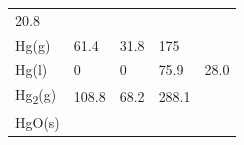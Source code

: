 \documentclass[
]{book}
\theoremstyle{definition}
\theoremstyle{definition}
\theoremstyle{definition}
\theoremstyle{remark}
\begin{document}
\begin{longtable}[]{@{}lllll@{}}
\begin{minipage}[t]{0.18\columnwidth}
20.8\strut
\end{minipage}\tabularnewline
\begin{minipage}[t]{0.10\columnwidth}\raggedright
Hg(g)\strut
\end{minipage} & \begin{minipage}[t]{0.19\columnwidth}\raggedright
61.4\strut
\end{minipage} & \begin{minipage}[t]{0.20\columnwidth}\raggedright
31.8\strut
\end{minipage} & \begin{minipage}[t]{0.18\columnwidth}\raggedright
175\strut
\end{minipage} & \begin{minipage}[t]{0.18\columnwidth}\raggedright
\strut
\end{minipage}\tabularnewline
\begin{minipage}[t]{0.10\columnwidth}\raggedright
Hg(l)\strut
\end{minipage} & \begin{minipage}[t]{0.19\columnwidth}\raggedright
0\strut
\end{minipage} & \begin{minipage}[t]{0.20\columnwidth}\raggedright
0\strut
\end{minipage} & \begin{minipage}[t]{0.18\columnwidth}\raggedright
75.9\strut
\end{minipage} & \begin{minipage}[t]{0.18\columnwidth}\raggedright
28.0\strut
\end{minipage}\tabularnewline
\begin{minipage}[t]{0.10\columnwidth}\raggedright
Hg\textsubscript{2}(g)\strut
\end{minipage} & \begin{minipage}[t]{0.19\columnwidth}\raggedright
108.8\strut
\end{minipage} & \begin{minipage}[t]{0.20\columnwidth}\raggedright
68.2\strut
\end{minipage} & \begin{minipage}[t]{0.18\columnwidth}\raggedright
288.1\strut
\end{minipage} & \begin{minipage}[t]{0.18\columnwidth}\raggedright
\strut
\end{minipage}\tabularnewline
\begin{minipage}[t]{0.10\columnwidth}\raggedright
HgO(s)\strut

\end{minipage}
\end{longtable}
\end{document}
